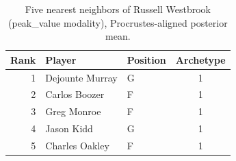 \begin{table}[htbp]
  \centering\small
  \begin{tabular}{rllc}
    \toprule
    Rank & Player & Position & Archetype \\
    \midrule
    1 & Dejounte Murray & G & 1 \\
    2 & Carlos Boozer & F & 1 \\
    3 & Greg Monroe & F & 1 \\
    4 & Jason Kidd & G & 1 \\
    5 & Charles Oakley & F & 1 \\
    \bottomrule
  \end{tabular}
  \caption{Five nearest neighbors of Russell Westbrook (peak_value modality), Procrustes-aligned posterior mean.}
  \label{tab:Russell_Westbrook_neighbors_peak_value}
\end{table}

